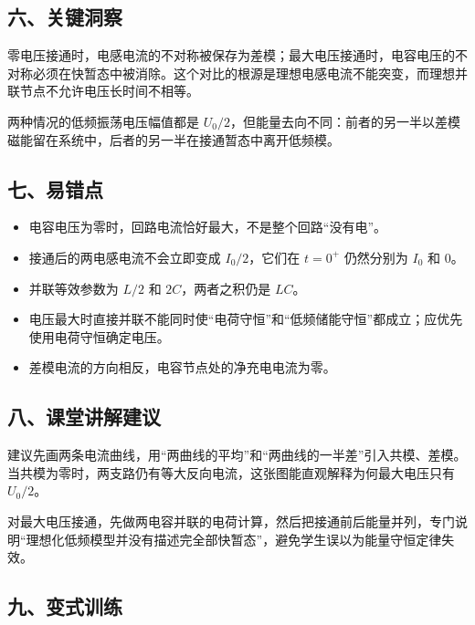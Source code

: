 \documentclass[12pt,a4paper,UTF8]{ctexart}
\newcommand{\tightlist}{\setlength{\itemsep}{0pt}\setlength{\parskip}{0pt}}
\begin{document}
\subsection{六、关键洞察}\label{ux516dux5173ux952eux6d1eux5bdf-3}

零电压接通时，电感电流的不对称被保存为差模；最大电压接通时，电容电压的不对称必须在快暂态中被消除。这个对比的根源是理想电感电流不能突变，而理想并联节点不允许电压长时间不相等。

两种情况的低频振荡电压幅值都是
\(U_0/2\)，但能量去向不同：前者的另一半以差模磁能留在系统中，后者的另一半在接通暂态中离开低频模。

\subsection{七、易错点}\label{ux4e03ux6613ux9519ux70b9-3}

\begin{itemize}
\tightlist
\item
  电容电压为零时，回路电流恰好最大，不是整个回路``没有电''。
\item
  接通后的两电感电流不会立即变成 \(I_0/2\)，它们在 \(t=0^+\) 仍然分别为
  \(I_0\) 和 \(0\)。
\item
  并联等效参数为 \(L/2\) 和 \(2C\)，两者之积仍是 \(LC\)。
\item
  电压最大时直接并联不能同时使``电荷守恒''和``低频储能守恒''都成立；应优先使用电荷守恒确定电压。
\item
  差模电流的方向相反，电容节点处的净充电电流为零。
\end{itemize}

\subsection{八、课堂讲解建议}\label{ux516bux8bfeux5802ux8bb2ux89e3ux5efaux8bae-3}

建议先画两条电流曲线，用``两曲线的平均''和``两曲线的一半差''引入共模、差模。当共模为零时，两支路仍有等大反向电流，这张图能直观解释为何最大电压只有
\(U_0/2\)。

对最大电压接通，先做两电容并联的电荷计算，然后把接通前后能量并列，专门说明``理想化低频模型并没有描述完全部快暂态''，避免学生误以为能量守恒定律失效。

\subsection{九、变式训练}\label{ux4e5dux53d8ux5f0fux8badux7ec3-3}
\end{document}
